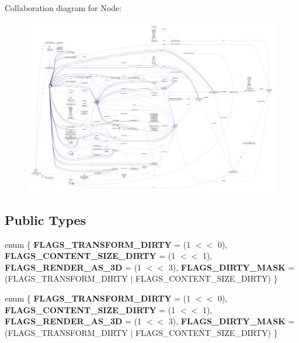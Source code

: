 Collaboration diagram for Node\+:
\nopagebreak
\begin{figure}[H]
\begin{center}
\leavevmode
\includegraphics[width=350pt]{classNode__coll__graph}
\end{center}
\end{figure}
\subsection*{Public Types}
\begin{DoxyCompactItemize}
\item 
\mbox{\label{classNode_a80347cd8f3e30ff3faace5bf580cbc37}} 
enum \{ {\bfseries F\+L\+A\+G\+S\+\_\+\+T\+R\+A\+N\+S\+F\+O\+R\+M\+\_\+\+D\+I\+R\+TY} = (1 $<$$<$ 0), 
{\bfseries F\+L\+A\+G\+S\+\_\+\+C\+O\+N\+T\+E\+N\+T\+\_\+\+S\+I\+Z\+E\+\_\+\+D\+I\+R\+TY} = (1 $<$$<$ 1), 
{\bfseries F\+L\+A\+G\+S\+\_\+\+R\+E\+N\+D\+E\+R\+\_\+\+A\+S\+\_\+3D} = (1 $<$$<$ 3), 
{\bfseries F\+L\+A\+G\+S\+\_\+\+D\+I\+R\+T\+Y\+\_\+\+M\+A\+SK} = (F\+L\+A\+G\+S\+\_\+\+T\+R\+A\+N\+S\+F\+O\+R\+M\+\_\+\+D\+I\+R\+TY $\vert$ F\+L\+A\+G\+S\+\_\+\+C\+O\+N\+T\+E\+N\+T\+\_\+\+S\+I\+Z\+E\+\_\+\+D\+I\+R\+TY)
 \}
\item 
\mbox{\label{classNode_aab5541f9d4c99ae10697c6b4fa62fab4}} 
enum \{ {\bfseries F\+L\+A\+G\+S\+\_\+\+T\+R\+A\+N\+S\+F\+O\+R\+M\+\_\+\+D\+I\+R\+TY} = (1 $<$$<$ 0), 
{\bfseries F\+L\+A\+G\+S\+\_\+\+C\+O\+N\+T\+E\+N\+T\+\_\+\+S\+I\+Z\+E\+\_\+\+D\+I\+R\+TY} = (1 $<$$<$ 1), 
{\bfseries F\+L\+A\+G\+S\+\_\+\+R\+E\+N\+D\+E\+R\+\_\+\+A\+S\+\_\+3D} = (1 $<$$<$ 3), 
{\bfseries F\+L\+A\+G\+S\+\_\+\+D\+I\+R\+T\+Y\+\_\+\+M\+A\+SK} = (F\+L\+A\+G\+S\+\_\+\+T\+R\+A\+N\+S\+F\+O\+R\+M\+\_\+\+D\+I\+R\+TY $\vert$ F\+L\+A\+G\+S\+\_\+\+C\+O\+N\+T\+E\+N\+T\+\_\+\+S\+I\+Z\+E\+\_\+\+D\+I\+R\+TY)
 \}
\end{DoxyCompactItemize}
